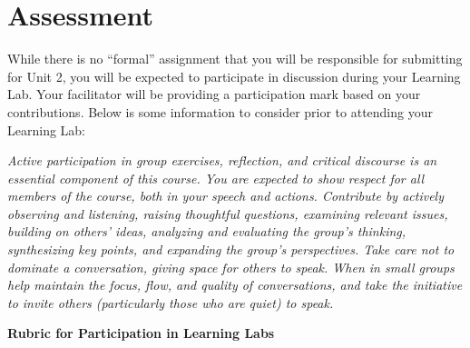 \documentclass[
]{book}
\begin{document}
\hypertarget{assessment-1}{%
\section*{Assessment}\label{assessment-1}}

\begin{assessment}
While there is no ``formal'' assignment that you will be responsible for submitting for Unit 2, you will be expected to participate in discussion during your Learning Lab. Your facilitator will be providing a participation mark based on your contributions. Below is some information to consider prior to attending your Learning Lab:

\emph{Active participation in group exercises, reflection, and critical discourse is an essential component of this course. You are expected to show respect for all members of the course, both in your speech and actions. Contribute by actively observing and listening, raising thoughtful questions, examining relevant issues, building on others' ideas, analyzing and evaluating the group's thinking, synthesizing key points, and expanding the group's perspectives. Take care not to dominate a conversation, giving space for others to speak. When in small groups help maintain the focus, flow, and quality of conversations, and take the initiative to invite others (particularly those who are quiet) to speak.}

\textbf{Rubric for Participation in Learning Labs}


\end{assessment}
\end{document}
